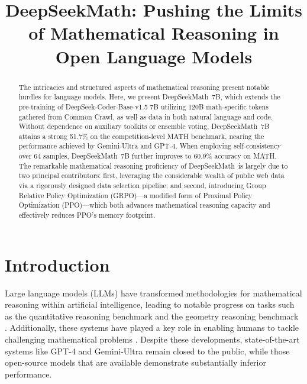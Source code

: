 \title{DeepSeekMath: Pushing the Limits of Mathematical Reasoning in Open Language Models}

\begin{abstract}
The intricacies and structured aspects of mathematical reasoning present notable hurdles for language models. Here, we present DeepSeekMath~7B, which extends the pre-training of DeepSeek-Coder-Base-v1.5 7B utilizing 120B math-specific tokens gathered from Common Crawl, as well as data in both natural language and code. Without dependence on auxiliary toolkits or ensemble voting, DeepSeekMath~7B attains a strong 51.7\% on the competition-level MATH benchmark, nearing the performance achieved by Gemini-Ultra and GPT-4. When employing self-consistency over 64 samples, DeepSeekMath~7B further improves to 60.9\% accuracy on MATH. The remarkable mathematical reasoning proficiency of DeepSeekMath~is largely due to two principal contributors: first, leveraging the considerable wealth of public web data via a rigorously designed data selection pipeline; and second, introducing Group Relative Policy Optimization (GRPO)—a modified form of Proximal Policy Optimization (PPO)—which both advances mathematical reasoning capacity and effectively reduces PPO's memory footprint.
\end{abstract}

\section{Introduction}

Large language models (LLMs) have transformed methodologies for mathematical reasoning within artificial intelligence, leading to notable progress on tasks such as the quantitative reasoning benchmark \citep{MATH} and the geometry reasoning benchmark \citep{trinh2024solving}. Additionally, these systems have played a key role in enabling humans to tackle challenging mathematical problems \citep{tao}. Despite these developments, state-of-the-art systems like GPT-4 \citep{gpt4} and Gemini-Ultra \citep{gemini} remain closed to the public, while those open-source models that are available demonstrate substantially inferior performance.

